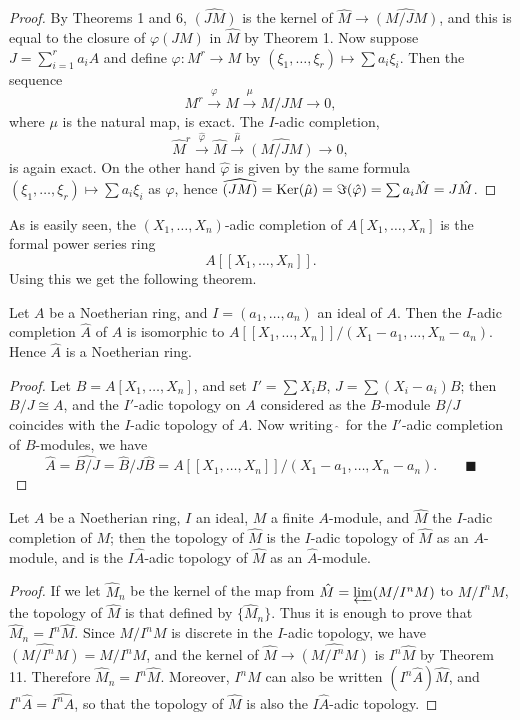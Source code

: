 \begin{proof}
By Theorems 1 and 6, $\widehat{(JM)}$ is the kernel of $\hat{M} \to \widehat{(M/JM)}$, and
this is equal to the closure of $\varphi(JM)$ in $\hat{M}$ by Theorem 1. Now suppose $J
= \sum_{i=1}^{r} a_iA$ and define $\varphi\colon M^r \to M$ by $(\xi_1, \ldots, \xi_r) \mapsto \sum a_i\xi_i$. Then the
sequence
\[
  M^r \xrightarrow{\varphi} M \xrightarrow{\mu} M/JM \to 0,
\]
where $\mu$ is the natural map, is exact. The $I$-adic completion,
\[
  \hat{M}^r \xrightarrow{\hat{\varphi}} \hat{M} \xrightarrow{\hat{\mu}} \widehat{(M/JM)} \to 0,
\]
is again exact. On the other hand $\hat{\varphi}$ is given by the same formula
$(\xi_1, \ldots, \xi_r) \mapsto \sum a_i\xi_i$ as $\varphi$, hence $\widehat{(JM)} = \operatorname{Ker}(\hat{\mu}) = \Im(\hat{\varphi}) = \sum a_i\hat{M} = J\hat{M}$.
\end{proof}

As is easily seen, the $(X_1, \ldots, X_n)$-adic completion of $A[X_1, \ldots, X_n]$
is the formal power series ring
\[
  A[[X_1, \ldots, X_n]].
\]
Using this we get the following theorem.

\begin{theorem}\label{thm:8.12}
Let $A$ be a Noetherian ring, and $I = (a_1, \ldots, a_n)$ an ideal of
$A$. Then the $I$-adic completion $\hat{A}$ of $A$ is isomorphic to
$A[[X_1, \ldots, X_n]]/(X_1 - a_1, \ldots, X_n - a_n)$. Hence $\hat{A}$ is a Noetherian ring.
\end{theorem}

\begin{proof}
Let $B = A[X_1, \ldots, X_n]$, and set $I' = \sum X_iB$, $J = \sum (X_i - a_i)B$;
then $B/J \cong A$, and the $I'$-adic topology on $A$ considered as the $B$-module
$B/J$ coincides with the $I$-adic topology of $A$. Now writing $\hat{\;}$ for the $I'$-adic
completion of $B$-modules, we have
\[
  \hat{A} = \widehat{B/J} = \hat{B}/J\hat{B} = A[[X_1, \ldots, X_n]]/(X_1 - a_1, \ldots, X_n - a_n). \qquad\blacksquare
\]
\end{proof}

\begin{theorem}\label{thm:8.13}
Let $A$ be a Noetherian ring, $I$ an ideal, $M$ a finite $A$-module,
and $\hat{M}$ the $I$-adic completion of $M$; then the topology of $\hat{M}$ is the $I$-adic
topology of $\hat{M}$ as an $A$-module, and is the $I\hat{A}$-adic topology of $\hat{M}$ as
an $\hat{A}$-module.
\end{theorem}

\begin{proof}
If we let $\hat{M}_n$ be the kernel of the map from $\hat{M} = \varprojlim (M/I^nM)$ to
$M/I^nM$, the topology of $\hat{M}$ is that defined by $\{\hat{M}_n\}$. Thus it is enough to
prove that $\hat{M}_n = I^n\hat{M}$. Since $M/I^nM$ is discrete in the $I$-adic topology, we
have $\widehat{(M/I^nM)} = M/I^nM$, and the kernel of $\hat{M} \to \widehat{(M/I^nM)}$ is $I^n\hat{M}$ by
Theorem 11. Therefore $\hat{M}_n = I^n\hat{M}$. Moreover, $I^n\hat{M}$ can also be written
$(I^n\hat{A})\hat{M}$, and $I^n\hat{A} = \widehat{I^nA}$, so that the topology of $\hat{M}$ is also the $I\hat{A}$-adic
topology.
\end{proof}

